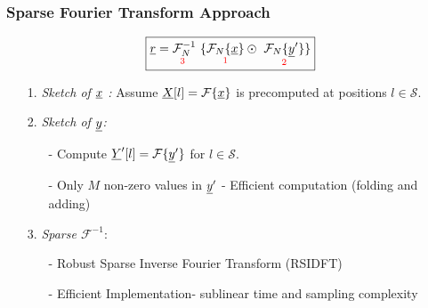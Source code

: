 \begin{frame}\frametitle{Sparse Fourier Transform Approach}
	\begin{figure}[t]
		\centering
		\scalebox{0.28}{}
	\end{figure}
\vspace{-0.2cm}
	 	\begin{block}{}
	 		\begin{equation}\label{eqn:Rxy_fourier} \nonumber
	 		\boxed{\underline{r} = \underset{\text{\color{red} 3 } } {\mathcal{F}_{N}^{-1}} \ \{ \underset{\text{ \color{red} 1 } }{  \mathcal{F}_{N}\{\underline{x}\}}  \odot \ \underset{\text{ \color{red} 2 } }{ \mathcal{F}_{N}\{\underline{y}'\}}  \} }
	 		\end{equation} 
	 		
	 		\begin{itemize} 
	 			\item[\color{red} 1.] \textit{\color{blue} Sketch of $\underline{x}$ : }  Assume $ \underline{X}[l] = \mathcal{F}\{\underline{x}\}$ is precomputed at positions $l \in \mathcal{S}$.
	 			
	 			\item[\color{red} 2.] \textit{\color{blue} Sketch of $\underline{y}$:}
	 			\begin{itemize} 
	 				\item[-] Compute $ \underline{Y}'[l] = \mathcal{F}\{\underline{y}'\}$ for $l \in \mathcal{S}$.
	 				\item[-] Only $M$ non-zero values in $\underline{y}'$ - Efficient computation (folding and adding)
	 			\end{itemize}
	 			
	 			\item[\color{red} 3.] \textit{\color{blue} Sparse $\mathcal{F}^{-1}$}:
	 			\begin{itemize}  
	 				\item[-] Robust Sparse Inverse Fourier Transform (RSIDFT)
	 				\item[-] Efficient Implementation- {\color{blue} sublinear} time and sampling complexity
	 			\end{itemize}
	 		\end{itemize}
	 	\end{block}
\end{frame}


